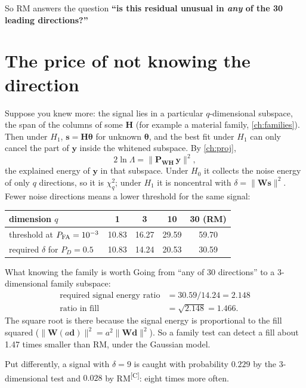 \documentclass[11pt,a4paper,oneside,openany]{book}
\newcommand{\B}[1]{{\symbf{#1}}}
\newcommand{\B}[1]{{\bm{#1}}}
\newcommand{\comp}{\textsuperscript{\textsf{\scriptsize[C]}}}
\newcommand{\nrm}[1]{\lVert #1\rVert}
\newcommand{\vd}{\B{d}}
\newcommand{\vs}{\B{s}}
\newcommand{\vy}{\B{y}}
\newcommand{\vtheta}{\B{\theta}}
\newcommand{\mW}{\B{W}}
\newcommand{\mH}{\B{H}}
\newcommand{\mP}{\B{P}}
\begin{document}
So RM answers the question \textbf{``is this residual unusual in \emph{any} of the 30 leading directions?''}

\section{The price of not knowing the direction}

Suppose you knew more: the signal lies in a particular $q$-dimensional subspace, the span of the columns of some $\mH$ (for example a
material family, \cref{ch:families}). Then under $H_1$, $\vs=\mH\vtheta$ for unknown $\vtheta$, and the best fit under $H_1$ can only cancel
the part of $\vy$ inside the whitened subspace. By \cref{ch:proj},
\[
  2\ln\Lambda=\nrm{\mP_{\mW\mH}\,\vy}^2 ,
\]
the explained energy of $\vy$ in that subspace. Under $H_0$ it collects the noise energy of only $q$ directions, so it is $\chi^2_q$;
under $H_1$ it is noncentral with $\delta=\nrm{\mW\vs}^2$. Fewer noise directions means a lower threshold for the same signal:

\begin{center}
\begin{tabular}{@{}lcccc@{}}
\toprule
dimension $q$ & 1 & 3 & 10 & 30 (RM)\\
\midrule
threshold at $P_{\rm FA}=10^{-3}$ & 10.83 & 16.27 & 29.59 & 59.70\\
required $\delta$ for $P_D=0.5$ & 10.83 & 14.24 & 20.53 & 30.59\\
\bottomrule
\end{tabular}
\end{center}

\begin{worked}[label=we:price]{What knowing the family is worth}
Going from ``any of 30 directions'' to a 3-dimensional family subspace:
\begin{align*}
\text{required signal energy ratio} &= 30.59/14.24=2.148\\
\text{ratio in fill} &= \sqrt{2.148}=1.466 .
\end{align*}
The square root is there because the signal energy is proportional to the fill squared ($\nrm{\mW(a\vd)}^2=a^2\nrm{\mW\vd}^2$). So a
family test can detect a fill about 1.47 times smaller than RM, under the Gaussian model.

Put differently, a signal with $\delta=9$ is caught with probability $0.229$ by the 3-dimensional test and $0.028$ by RM\comp: eight times
more often.
\end{worked}
\end{document}
